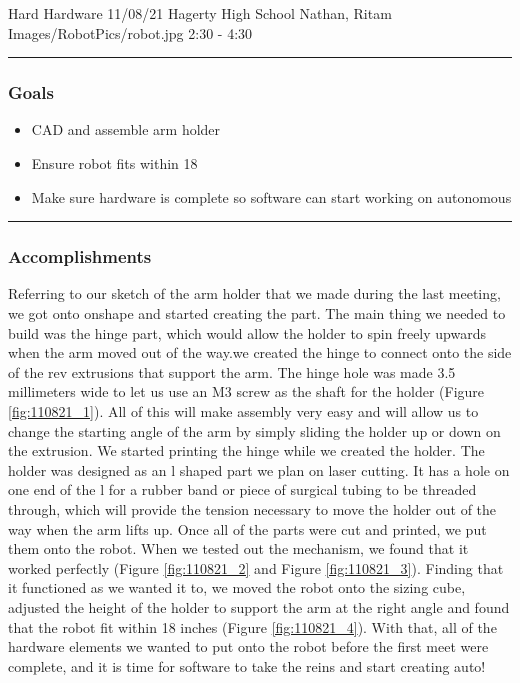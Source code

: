 \insertmeeting 
	{Hard Hardware} 
	{11/08/21}
	{Hagerty High School}
	{Nathan, Ritam}
	{Images/RobotPics/robot.jpg}
	{2:30 - 4:30}
	
\noindent\hfil\rule{\textwidth}{.4pt}\hfil
\subsubsection*{Goals}
\begin{itemize}
    \item CAD and assemble arm holder
    \item Ensure robot fits within 18
    \item Make sure hardware is complete so software can start working on autonomous
 

\end{itemize} 

\noindent\hfil\rule{\textwidth}{.4pt}\hfil

\subsubsection*{Accomplishments}
Referring to our sketch of the arm holder that we made during the last meeting, we got onto onshape and started creating the part. The main thing we needed to build was the hinge part, which would allow the holder to spin freely upwards when the arm moved out of the way.we created the hinge to connect onto the side of the rev extrusions that support the arm. The hinge hole was made 3.5 millimeters wide to let us use an M3 screw as the shaft for the holder (Figure \ref{fig:110821_1}). All of this will make assembly very easy and will allow us to change the starting angle of the arm by simply sliding the holder up or down on the extrusion. We started printing the hinge while we created the holder. The holder was designed as an l shaped part we plan on laser cutting. It has a hole on one end of the l for a rubber band or piece of surgical tubing to be threaded through, which will provide the tension necessary to move the holder out of the way when the arm lifts up. Once all of the parts were cut and printed, we put them onto the robot. When we tested out the mechanism, we found that it worked perfectly (Figure \ref{fig:110821_2} and Figure \ref{fig:110821_3}). Finding that it functioned as we wanted it to, we moved the robot onto the sizing cube, adjusted the height of the holder to support the arm at the right angle and found that the robot fit within 18 inches (Figure \ref{fig:110821_4}). With that, all of the hardware elements we wanted to put onto the robot before the first meet were complete, and it is time for software to take the reins and start creating auto!

